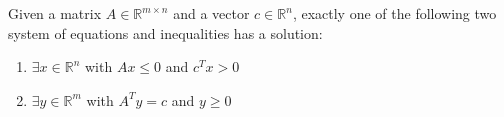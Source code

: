 Given a matrix $A \in \mathbb{R}^{m \times n}$ and a vector $c \in \mathbb{R}^n$, exactly one of the following two system of equations and inequalities has a solution:
  \begin{enumerate}
    \item $\exists x \in \mathbb{R}^n$ with $A x \leq 0$ and $c^T x > 0$
    \item $\exists y \in \mathbb{R}^m$ with $A^T y = c$ and $y \geq 0$
  \end{enumerate}
